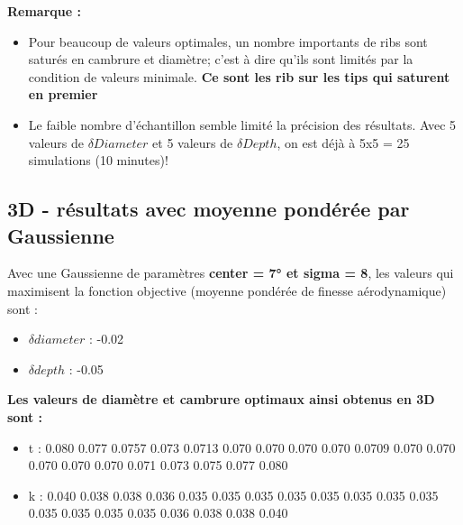 \documentclass[conference]{IEEEtran}
\begin{document}
    \textbf{Remarque :}
    \begin{itemize}
        \item Pour beaucoup de valeurs optimales, un nombre importants de ribs sont saturés en cambrure et diamètre; c'est à dire qu'ils sont limités par la condition de valeurs minimale. \textbf{Ce sont les rib sur les tips qui saturent en premier}
        \item Le faible nombre d'échantillon semble limité la précision des résultats. Avec 5 valeurs de $\delta Diameter$ et 5 valeurs de $\delta Depth$, on est déjà à 5x5 = 25 simulations (10 minutes)!
    \end{itemize}

\subsection{3D - résultats avec moyenne pondérée par Gaussienne}
Avec une Gaussienne de paramètres \textbf{center = 7° et sigma = 8}, les valeurs qui maximisent la fonction objective (moyenne pondérée de finesse aérodynamique) sont :
\begin{itemize}
    \item $\delta diameter$ : -0.02
    \item $\delta depth$ : -0.05
\end{itemize}

\textbf{Les valeurs de diamètre et cambrure optimaux ainsi obtenus en 3D sont : 
}

\begin{itemize}
    \item t : 0.080 0.077 0.0757 0.073 0.0713 0.070 0.070  0.070 0.070 0.0709  0.070  0.070 0.070 0.070 0.070 0.071 0.073 0.075 0.077 0.080
    \item k : 0.040 0.038 0.038 0.036 0.035 0.035 0.035  0.035 0.035 0.035 0.035 0.035 0.035 0.035  0.035 0.035 0.036 0.038 0.038 0.040
\end{itemize}
\end{document}
